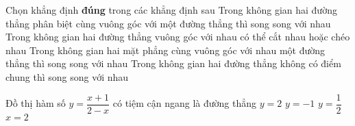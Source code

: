 \begin{ex}%
Chọn khẳng định {\bf{đúng}} trong các khẳng định sau
	\choice
	{Trong không gian hai đường thẳng phân biệt cùng vuông góc với một đường thẳng thì song song với nhau}
	{\True Trong không gian hai đường thẳng vuông góc với nhau có thể cắt nhau hoặc chéo nhau}
	{Trong không gian hai mặt phẳng cùng vuông góc với nhau một đường thẳng thì song song với nhau}
	{Trong không gian hai đường thẳng không có điểm chung thì song song với nhau}
\end{ex}

\begin{ex}%
	Đồ thị hàm số $y = \dfrac{x + 1}{2 - x}$ có tiệm cận ngang là đường thẳng
	\choice
	{$y =  2$}
	{\True $y =  - 1$}
	{$y =  \dfrac{1}{2}$}
	{$x =  2$}
\end{ex}

